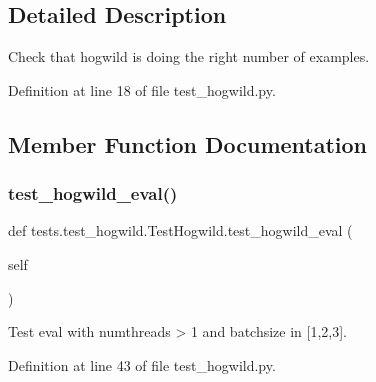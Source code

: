 \subsection{Detailed Description}
\begin{DoxyVerb}Check that hogwild is doing the right number of examples.
\end{DoxyVerb}
 

Definition at line 18 of file test\+\_\+hogwild.\+py.



\subsection{Member Function Documentation}
\mbox{\label{classtests_1_1test__hogwild_1_1TestHogwild_a0d83543defe591e2c7db1a94dce52189}} 
\subsubsection{\texorpdfstring{test\+\_\+hogwild\+\_\+eval()}{test\_hogwild\_eval()}}
{\footnotesize\ttfamily def tests.\+test\+\_\+hogwild.\+Test\+Hogwild.\+test\+\_\+hogwild\+\_\+eval (\begin{DoxyParamCaption}\item[{}]{self }\end{DoxyParamCaption})}

\begin{DoxyVerb}Test eval with numthreads > 1 and batchsize in [1,2,3].
\end{DoxyVerb}
 

Definition at line 43 of file test\+\_\+hogwild.\+py.


